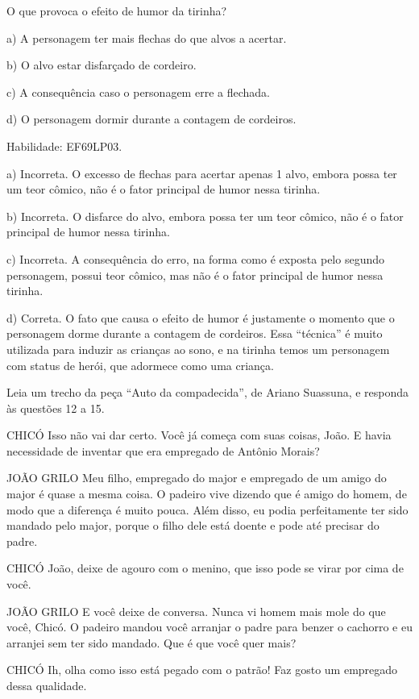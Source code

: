 
O que provoca o efeito de humor da tirinha?

a) A personagem ter mais flechas do que alvos a acertar.

b) O alvo estar disfarçado de cordeiro.

c) A consequência caso o personagem erre a flechada.

d) O personagem dormir durante a contagem de cordeiros.

Habilidade: EF69LP03.

a) Incorreta. O excesso de flechas para acertar apenas 1 alvo, embora
possa ter um teor cômico, não é o fator principal de humor nessa
tirinha.

b) Incorreta. O disfarce do alvo, embora possa ter um teor cômico, não é
o fator principal de humor nessa tirinha.

c) Incorreta. A consequência do erro, na forma como é exposta pelo
segundo personagem, possui teor cômico, mas não é o fator principal de
humor nessa tirinha.

d) Correta. O fato que causa o efeito de humor é justamente o momento
que o personagem dorme durante a contagem de cordeiros. Essa ``técnica''
é muito utilizada para induzir as crianças ao sono, e na tirinha temos
um personagem com status de herói, que adormece como uma criança.

Leia um trecho da peça ``Auto da compadecida'', de Ariano Suassuna, e
responda às questões 12 a 15.

CHICÓ Isso não vai dar certo. Você já começa com suas coisas, João. E
havia necessidade de inventar que era empregado de Antônio Morais?

JOÃO GRILO Meu filho, empregado do major e empregado de um amigo do
major é quase a mesma coisa. O padeiro vive dizendo que é amigo do
homem, de modo que a diferença é muito pouca. Além disso, eu podia
perfeitamente ter sido mandado pelo major, porque o filho dele está
doente e pode até precisar do padre.

CHICÓ João, deixe de agouro com o menino, que isso pode se virar por
cima de você.

JOÃO GRILO E você deixe de conversa. Nunca vi homem mais mole do que
você, Chicó. O padeiro mandou você arranjar o padre para benzer o
cachorro e eu arranjei sem ter sido mandado. Que é que você quer mais?

CHICÓ Ih, olha como isso está pegado com o patrão! Faz gosto um
empregado dessa qualidade.

